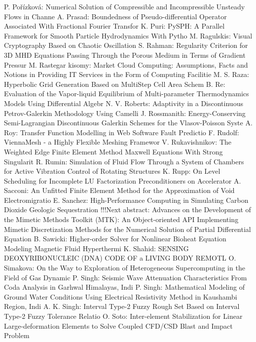 \documentclass[10pt, A4]{article}%
\begin{document}
{P. Pořízková}: {Numerical Solution of Compressible and Incompressible Unsteady Flows in Channe}
{A. Prasad}: {Boundedness of Pseudo-differential Operator Associated With Fractional Fourier Transfor}
{K. Puri}: {PySPH: A Parallel Framework for Smooth Particle Hydrodynamics With Pytho}
{M. Ragulskis}: {Visual Cryptography Based on Chaotic Oscillation}
{S. Rahman}: {Regularity Criterion for 3D MHD Equations Passing Through the Porous Medium in Terms of Gradient Pressur}
{M. Rastegar kisomy}: {Market Cloud Computing: Assumptions, Facts and Notions in Providing IT Services in the Form of Computing Facilitie}
{M. S. Raza}: {Hyperbolic Grid Generation Based on MultiStep Cell Area Schem}
{B. Re}: {Evaluation of the Vapor-liquid Equilibrium of Multi-parameter Thermodynamics Models Using Differential Algebr}
{N. V. Roberts}: {Adaptivity in a Discontinuous Petrov-Galerkin Methodology Using Camelli}
{J. Rossmanith}: {Energy-Conserving Semi-Lagrangian Discontinuous Galerkin Schemes for the Vlasov-Poisson Syste}
{A. Roy}: {Transfer Function Modelling in Web Software Fault Predictio}
{F. Rudolf}: {ViennaMesh - a Highly Flexible Meshing Framewor}
{V. Rukavishnikov}: {The Weighted Edge Finite Element Method Maxwell Equations With Strong Singularit}
{R. Rumin}: {Simulation of Fluid Flow Through a System of Chambers for Active Vibration Control of Rotating Structures}
{K. Rupp}: {On Level Scheduling for Incomplete LU Factorization Preconditioners on Accelerator}
{A. Sacconi}: {An Unfitted Finite Element Method for the Approximation of Void Electromigratio}
{E. Sanchez}: {High-Performance Computing in Simulating Carbon Dioxide Geologic Sequestration      !!!Next abstract: Advances on the Development of the Mimetic Methods Toolkit (MTK): An Object-oriented API Implementing Mimetic Discretization Methods for the Numerical Solution of Partial Differential Equation}
{B. Sawicki}: {Higher-order Solver for Nonlinear Bioheat Equation Modeling Magnetic Fluid Hyperthermi}
{K. Shahid}: {SENSING DEOXYRIBONUCLEIC (DNA) CODE OF a LIVING BODY REMOTL}
{O. Simakova}: {On the Way to Exploration of Heterogeneous Supercomputing in the Field of Gas Dynamic}
{P. Singh}: {Seismic Wave Attenuation Characteristics  From Coda Analysis in Garhwal Himalayas, Indi}
{P. Singh}: {Mathematical Modeling of Ground Water Conditions Using Electrical Resistivity Method in Kaushambi Region, Indi}
{A. K. Singh}: {Interval Type-2 Fuzzy Rough Set Based on Interval Type-2 Fuzzy Tolerance Relatio}
{O. Soto}: {Inter-element Stabilization for Linear Large-deformation Elements to Solve Coupled CFD/CSD Blast and Impact Problem}
\end{document}
